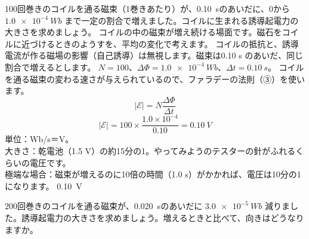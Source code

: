 \label{ph:電-8:ex1}
\begin{phreidai}[コイルを通る磁束が変わる]
100回巻きのコイルを通る磁束（1巻きあたり）が、\qty{0.10}{s}のあいだに、0から $\qty{1.0e-4}{Wb}$ まで一定の割合で増えました。コイルに生まれる誘導起電力の大きさを求めましょう。
\phbamen
コイルの中の磁束が増え続ける場面です。磁石をコイルに近づけるときのようすを、平均の変化で考えます。
\phmushi
コイルの抵抗と、誘導電流が作る磁場の影響（自己誘導）は無視します。磁束は0.10 s のあいだ、同じ割合で増えるとします。
\phzu
$N=100$、$\Delta\Phi=\qty{1.0e-4}{Wb}$、$\Delta t=\qty{0.10}{s}$。
\phriyu
コイルを通る磁束の変わる速さが与えられているので、ファラデーの法則（③）を使います。
\phtateru
\[ |\mathcal E|=N\frac{\Delta\Phi}{\Delta t} \]
\phtoku
\[ |\mathcal E|=100\times\frac{1.0\times10^{-4}}{0.10}=\qty{0.10}{V} \]
\phtashikame
単位：Wb/s＝V。\\
大きさ：乾電池（1.5 V）の約15分の1。やってみようのテスターの針がふれるくらいの電圧です。\\
極端な場合：磁束が増えるのに10倍の時間（1.0 s）がかかれば、電圧は10分の1になります。
\kotae \qty{0.10}{V}
\end{phreidai}
\begin{jibun}
200回巻きのコイルを通る磁束が、\qty{0.020}{s}のあいだに $\qty{3.0e-5}{Wb}$ 減りました。誘導起電力の大きさを求めましょう。増えるときと比べて、向きはどうなりますか。
\end{jibun}

